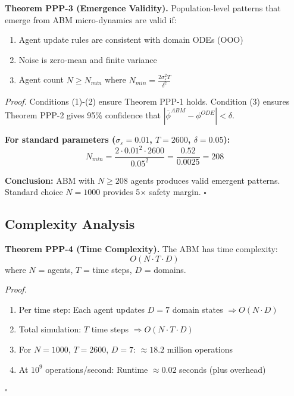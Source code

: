 \begin{tcolorbox}[colback=green!5!white, colframe=green!75!black, title=Theorem PPP-3: Emergence Validity]
\textbf{Theorem PPP-3 (Emergence Validity).}
Population-level patterns that emerge from ABM micro-dynamics are valid if:
\begin{enumerate}[nosep]
\item Agent update rules are consistent with domain ODEs (OOO)
\item Noise is zero-mean and finite variance
\item Agent count $N \geq N_{min}$ where $N_{min} = \frac{2\sigma^2_\varepsilon T}{\delta^2}$
\end{enumerate}

\textit{Proof.}
Conditions (1)-(2) ensure Theorem PPP-1 holds. Condition (3) ensures Theorem PPP-2
gives 95\% confidence that $|\bar{\phi}^{ABM} - \phi^{ODE}| < \delta$.

\textbf{For standard parameters ($\sigma_\varepsilon = 0.01$, $T = 2600$, $\delta = 0.05$):}
\begin{equation}
N_{min} = \frac{2 \cdot 0.01^2 \cdot 2600}{0.05^2} = \frac{0.52}{0.0025} = 208
\end{equation}

\textbf{Conclusion:} ABM with $N \geq 208$ agents produces valid emergent patterns.
Standard choice $N = 1000$ provides 5× safety margin.
\hfill $\square$
\end{tcolorbox}

\subsection{Complexity Analysis}

\begin{tcolorbox}[colback=yellow!5!white, colframe=yellow!75!black, title=Theorem PPP-4: Computational Complexity]
\textbf{Theorem PPP-4 (Time Complexity).}
The ABM has time complexity:
\begin{equation}
O(N \cdot T \cdot D)
\end{equation}
where $N$ = agents, $T$ = time steps, $D$ = domains.

\textit{Proof.}
\begin{enumerate}[nosep]
\item Per time step: Each agent updates $D = 7$ domain states $\Rightarrow O(N \cdot D)$
\item Total simulation: $T$ time steps $\Rightarrow O(N \cdot T \cdot D)$
\item For $N = 1000$, $T = 2600$, $D = 7$: $\approx 18.2$ million operations
\item At $10^9$ operations/second: Runtime $\approx 0.02$ seconds (plus overhead)
\end{enumerate}
\hfill $\square$
\end{tcolorbox}

